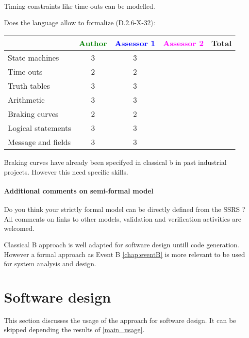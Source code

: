 \begin{author_comment}
Timing constraints like time-outs can be modelled.
\end{author_comment}


Does the language allow to  formalize (D.2.6-X-32):

\begin{tabular}{|l | c | c | c | c|}
\hline
& \textcolor{green}{Author} & \textcolor{blue}{Assessor 1} & \textcolor{magenta}{Assessor 2} & Total \\
\hline 
State machines  & 3 & 3 & &  \\
\hline
Time-outs  & 2 & 2 & &  \\
\hline
Truth tables  & 3 & 3 & &  \\
\hline
Arithmetic  & 3 & 3 & &  \\
\hline
Braking curves  & 2 & 2 & &  \\
\hline
Logical statements & 3 & 3 & &  \\
\hline
Message and fields & 3 & 3 & &  \\
\hline
\end{tabular}


\begin{author_comment}
Braking curves have already been specifyed in classical b  in past industrial projects. However this need specific skills.
\end{author_comment}


\paragraph{Additional comments on semi-formal  model} Do you think your strictly formal  model can be directly defined from the SSRS ?
All comments on links to  other models, validation and verification activities are welcomed.



\begin{author_comment}
Classical B  approach is well adapted for software design untill code generation. However a formal approach as Event B \ref{chap:eventB} is more relevant to be used for system analysis and design.
\end{author_comment}


\section{Software design}
This section discusses the usage of the approach for software design.
It can be skipped depending the results of \ref{main_usage}.

